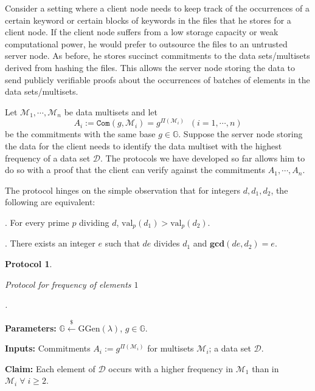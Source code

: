 \documentclass[11pt, lettersize, notitlepage, leqno, footskip=0.6cm]{article}
\newcommand{\ttt}{\texttt}
\newcommand{\bG}{\mathbb{G}}
\newcommand{\mc}{\mathcal}
\newcommand{\mb}{\mathbb}
\newcommand{\mbf}{\mathbf}
\newcommand{\mr}{\mathrm}
\newcommand{\lamb}{\lambda}
\newcommand{\vs}{\vspace{-0.15cm}}
\newcommand{\noin}{\noindent}
\newcommand{\GCD}{\mbf{gcd}}
\newtheorem{Prot}[Thm]{Protocol}
\numberwithin{equation}{section}
\begin{document}
Consider a setting where a client node needs to keep track of the occurrences of a certain keyword or certain blocks of keywords in the files that he stores for a client node. If the client node suffers from a low storage capacity or weak computational power, he would prefer to outsource the files to an untrusted server node. As before, he stores succinct commitments to the data sets/multisets derived from hashing the files. This allows the server node storing the data to send publicly verifiable proofs about the occurrences of batches of elements in the data sets/multisets.

Let $\mc{M}_1,\cdots, \mc{M}_n$ be data multisets and let \vs $$A_i:= \ttt{Com}(g,\mc{M}_i) = g^{\Pi(\mc{M}_i)}\;\;(i=1,\cdots,n) $$ be the commitments with the same base $g\in \bG$. Suppose the server node storing the data for the client needs to identify the data multiset with the highest frequency of a data set $\mc{D}$. The protocols we have developed so far allows him to do so with a proof that the client can verify against the commitments $A_1,\cdots,A_n$.

The protocol hinges on the simple observation that for integers $d,d_1,d_2$, the following are equivalent:

\noin 1. For every prime $p$ dividing $d$, $\mr{val}_p(d_1) > \mr{val}_p(d_2).$

\noin 2. There exists an integer $e$ such that $de$ divides $d_1$ and $\GCD(de, d_2) = e$.

\vspace{0.1cm}

\begin{Prot}\hypertarget{Freq}{Protocol for frequency of elements $1$}.\end{Prot} \vspace{-0.3cm}

\noin \textbf{Parameters:} $\mb{G}\xleftarrow{\$} \mr{GGen}(\lamb)$,\; $g\in \mb{G}$.

\noin \textbf{Inputs:} Commitments $A_i := g^{\Pi(\mc{M}_i)}$ for multisets $\mc{M}_i$; a data set $\mc{D}$.

\noin \textbf{Claim:} Each element of $\mc{D}$ occurs with a higher frequency in $\mc{M}_1$ than in $\mc{M}_i\;\forall\;i\geq 2$.\vs
\end{document}
